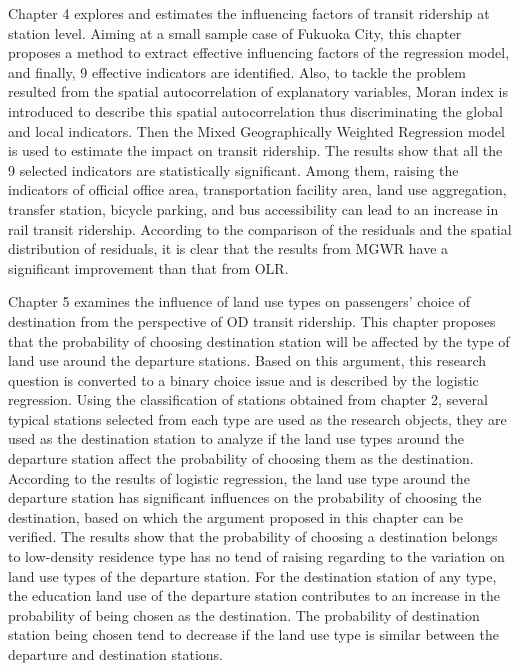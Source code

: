 \documentclass[12pt, twoside, a4paper]{book} %
\begin{document}
Chapter 4 explores and estimates the influencing factors of transit ridership at station level. Aiming at a small sample case of Fukuoka City, this chapter proposes a method to extract effective influencing factors of the regression model, and finally, 9 effective indicators are identified. Also, to tackle the problem resulted from the spatial autocorrelation of explanatory variables, Moran index is introduced to describe this spatial autocorrelation thus discriminating the global and local indicators. Then the Mixed Geographically Weighted Regression model is used to estimate the impact on transit ridership. The results show that all the 9 selected indicators are statistically significant. Among them, raising the indicators of official office area, transportation facility area, land use aggregation, transfer station, bicycle parking, and bus accessibility can lead to an increase in rail transit ridership. According to the comparison of the residuals and the spatial distribution of residuals, it is clear that the results from MGWR have a significant improvement than that from OLR.

Chapter 5 examines the influence of land use types on passengers' choice of destination from the perspective of OD transit ridership. This chapter proposes that the probability of choosing destination station will be affected by the type of land use around the departure stations. Based on this argument, this research question is converted to a binary choice issue and is described by the logistic regression. Using the classification of stations obtained from chapter 2, several typical stations selected from each type are used as the research objects, they are used as the destination station to analyze if the land use types around the departure station affect the probability of choosing them as the destination. According to the results of logistic regression, the land use type around the departure station has significant influences on the probability of choosing the destination, based on which the argument proposed in this chapter can be verified. The results show that the probability of choosing a destination belongs to low-density residence type has no tend of raising regarding to the variation on land use types of the departure station. For the destination station of any type, the education land use of the departure station contributes to an increase in the probability of being chosen as the destination. The probability of destination station being chosen tend to decrease if the land use type is similar between the departure and destination stations.
\end{document}
